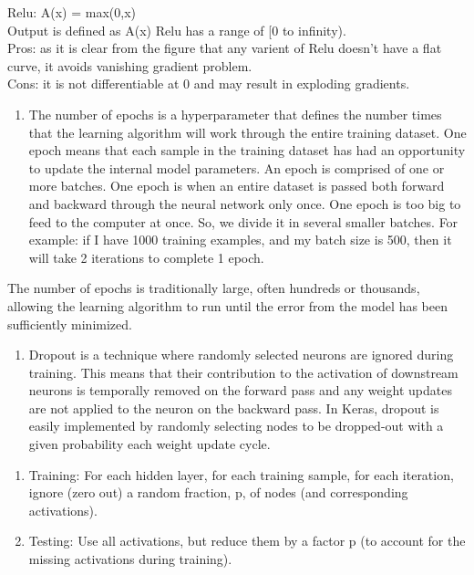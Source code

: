 \documentclass[11pt]{article}
\providecommand{\tightlist}{%
      \setlength{\itemsep}{0pt}\setlength{\parskip}{0pt}}
\begin{document}
Relu: A(x) = max(0,x)\\
Output is defined as A(x) Relu has a range of {[}0 to infinity).\\
Pros: as it is clear from the figure that any varient of Relu doesn't
have a flat curve, it avoids vanishing gradient problem.\\
Cons: it is not differentiable at 0 and may result in exploding
gradients.

    \begin{enumerate}
\def\labelenumi{\arabic{enumi})}
\setcounter{enumi}{5}
\tightlist
\item
  The number of epochs is a hyperparameter that defines the number times
  that the learning algorithm will work through the entire training
  dataset. One epoch means that each sample in the training dataset has
  had an opportunity to update the internal model parameters. An epoch
  is comprised of one or more batches. One epoch is when an entire
  dataset is passed both forward and backward through the neural network
  only once. One epoch is too big to feed to the computer at once. So,
  we divide it in several smaller batches. For example: if I have 1000
  training examples, and my batch size is 500, then it will take 2
  iterations to complete 1 epoch.
\end{enumerate}

The number of epochs is traditionally large, often hundreds or
thousands, allowing the learning algorithm to run until the error from
the model has been sufficiently minimized.

    \begin{enumerate}
\def\labelenumi{\arabic{enumi})}
\setcounter{enumi}{6}
\tightlist
\item
  Dropout is a technique where randomly selected neurons are ignored
  during training. This means that their contribution to the activation
  of downstream neurons is temporally removed on the forward pass and
  any weight updates are not applied to the neuron on the backward pass.
  In Keras, dropout is easily implemented by randomly selecting nodes to
  be dropped-out with a given probability each weight update cycle.
\end{enumerate}

\begin{enumerate}
\def\labelenumi{(\alph{enumi})}
\tightlist
\item
  Training: For each hidden layer, for each training sample, for each
  iteration, ignore (zero out) a random fraction, p, of nodes (and
  corresponding activations).\\
\item
  Testing: Use all activations, but reduce them by a factor p (to
  account for the missing activations during training).
\end{enumerate}
\end{document}
